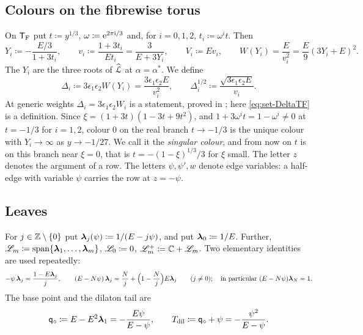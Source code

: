 \subsection{Colours on the fibrewise torus}
\label{sec:set-colours}

On $\mathsf{T}_{\mathrm{F}}$ put $t\coloneqq y^{1/3}$, $\omega\coloneqq\mathrm{e}^{2\pi\mathrm{i}/3}$ and, for $i=0,1,2$, $t_i\coloneqq\omega^it$. Then
\begin{equation}
\label{eq:set-colours}
Y_i\coloneqq-\frac{E/3}{1+3t_i},\qquad
v_i\coloneqq\frac{1+3t_i}{Et_i}=\frac{3}{E+3Y_i},\qquad
V_i\coloneqq Ev_i ,\qquad W(Y_i)=\frac{E}{v_i^2}=\frac E9(3Y_i+E)^2 .
\end{equation}
The $Y_i$ are the three roots of $\widehat{\mathcal{L}}$ at $\alpha=\alpha^*$. We define
\begin{equation}
\label{eq:set-DeltaTF}
\Delta_i\coloneqq3\epsilon_1\epsilon_2W(Y_i)=\frac{3\epsilon_1\epsilon_2E}{v_i^2},\qquad
\Delta_i^{1/2}\coloneqq\frac{\sqrt{3\epsilon_1\epsilon_2E}}{v_i}.
\end{equation}
At generic weights $\Delta_i=3\epsilon_1\epsilon_2W_i$ is a statement, proved in ; here \eqref{eq:set-DeltaTF} is a definition. Since $\xi=(1+3t)(1-3t+9t^2)$, and $1+3\omega^it=1-\omega^i\neq0$ at $t=-1/3$ for $i=1,2$, colour $0$ on the real branch $t\to-1/3$ is the unique colour with $Y_i\to\infty$ as $y\to-1/27$. We call it the \emph{singular colour}, and from now on $t$ is on this branch near $\xi=0$, that is $t=-(1-\xi)^{1/3}/3$ for $\xi$ small. The letter $z$ denotes the argument of a row. The letters $\psi,\psi',w$ denote edge variables: a half-edge with variable $\psi$ carries the row at $z=-\psi$.

\subsection{Leaves}
\label{sec:set-leaves}

For $j\in\mathbb{Z}\setminus\{0\}$ put $\boldsymbol{\lambda}_j(\psi)\coloneqq1/(E-j\psi)$, and put $\boldsymbol{\lambda}_0\coloneqq1/E$. Further, $\mathscr{L}_m\coloneqq\mathrm{span}\{\boldsymbol{\lambda}_1,\ldots,\boldsymbol{\lambda}_m\}$, $\mathscr{L}_0\coloneqq0$, $\mathscr{L}_m^{+}\coloneqq\mathbb{C}+\mathscr{L}_m$. Two elementary identities are used repeatedly:
\begin{equation}
\label{eq:set-lam}
-\psi\,\boldsymbol{\lambda}_j=\frac{1-E\boldsymbol{\lambda}_j}{j},\qquad (E-N\psi)\,\boldsymbol{\lambda}_j=\frac Nj+\Big(1-\frac Nj\Big)E\boldsymbol{\lambda}_j\qquad(j\neq0);\quad\text{in particular }(E-N\psi)\boldsymbol{\lambda}_N=1 .
\end{equation}
The base point and the dilaton tail are
\[
\mathsf{q}_{\circ}\coloneqq E-E^2\boldsymbol{\lambda}_1=-\frac{E\psi}{E-\psi},\qquad T_{\mathrm{dil}}\coloneqq\mathsf{q}_{\circ}+\psi=-\frac{\psi^2}{E-\psi}.
\]

